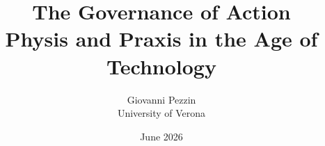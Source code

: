 \documentclass[11pt,a4paper]{report}
\title{\bfseries The Governance of Action \\[2pt]
\large Physis and Praxis in the Age of Technology}
\author{Giovanni Pezzin \\[2pt]
\large University of Verona}
\date{June 2026}
\begin{document}
\maketitle

\begin{abstract}

\end{abstract}

\tableofcontents
















\appendix


\printbibliography
\end{document}
